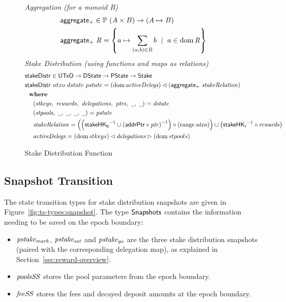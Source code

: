 \begin{figure}[htb]
  \emph{Aggregation (for a monoid B)}
  \begin{align*}
      & \mathsf{aggregate_{+}} \in \mathbb{P}~(A \times B) \to (A\mapsto B) \\
      & \mathsf{aggregate_{+}}~\mathit{R} = \left\{a\mapsto \sum_{(a,b)\in\mathit{R}}b
          ~\mid~a\in\operatorname{dom}\mathit{R}\right\} \\
  \end{align*}
  \emph{Stake Distribution (using functions and maps as relations)}
  \begin{align*}
      & \fun{stakeDistr} \in \UTxO \to \DState \to \PState \to \Stake \\
      & \fun{stakeDistr}~{utxo}~{dstate}~{pstate} =
      (\dom{\var{activeDelegs}})\restrictdom\left(\fun{aggregate_{+}}~\var{stakeRelation}\right)\\
      & \where \\
      & ~~~~ (\var{stkeys},~\var{rewards},~\var{delegations},~\var{ptrs},~\wcard,~\wcard)
        = \var{dstate} \\
      & ~~~~ (\var{stpools},~\wcard,~\wcard,~\wcard,~\wcard) = \var{pstate} \\
      & ~~~~ \var{stakeRelation} = \left(
        \left(\fun{stakeHK_b}^{-1}\cup\left(\fun{addrPtr}\circ\var{ptr}\right)^{-1}\right)
        \circ\left(\range{\var{utxo}}\right)
        \right)
        \cup \left(\fun{stakeHK_r}^{-1}\circ\var{rewards}\right) \\
      & ~~~~ \var{activeDelegs} =
               (\dom{stkeys}) \restrictdom \var{delegations} \restrictrange (\dom{stpools}) \\
  \end{align*}

  \caption{Stake Distribution Function}
  \label{fig:functions:stake-distribution}
\end{figure}

\clearpage

\subsection{Snapshot Transition}
\label{sec:snapshots}

The state transition types for stake distribution snapshots are given in
Figure~\ref{fig:ts-types:snapshot}. The type $\mathsf{\mathsf{Snapshots}}$ contains the
information needing to be saved on the epoch boundary:
\begin{itemize}
  \item $\mathit{pstake_{mark}}$, $\mathit{pstake_{set}}$ and $\mathit{pstake_{go}}$ are the three
    stake distribution snapshots (paired with the corresponding delegation map),
    as explained in Section~\ref{sec:reward-overview}.
  \item $\mathit{poolsSS}$ stores the pool parameters from the epoch boundary.
  \item $\mathit{feeSS}$ stores the fees and decayed deposit amounts at the epoch boundary.
\end{itemize}

